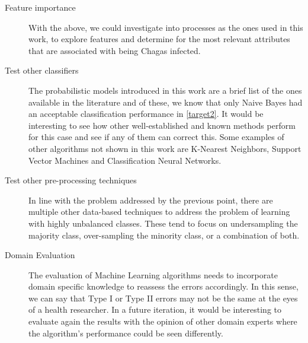 \begin{description}
    \item [Feature importance] With the above, we could investigate into processes as the ones used in this work, to explore features and determine for the most relevant attributes that are associated with being Chagas infected.

    \item [Test other classifiers] The probabilistic models introduced in this work are a brief list of the ones available in the literature and of these, we know that only Naive Bayes had an acceptable classification performance in \cref{target2}.
    It would be interesting to see how other well-established and known methods perform for this case and see if any of them can correct this.
    Some examples of other algorithms not shown in this work are K-Nearest Neighbors, Support Vector Machines and Classification Neural Networks.

    \item [Test other pre-processing techniques] In line with the problem addressed by the previous point, there are multiple other data-based techniques to address the problem of learning with highly unbalanced classes.
    These tend to focus on undersampling the majority class, over-sampling the minority class, or a combination of both.


    \item [Domain Evaluation] The evaluation of Machine Learning algorithms needs to incorporate domain specific knowledge to reassess the errors accordingly. In this sense, we can say that Type I or Type II errors may not be the same at the eyes of a health researcher.
    In a future iteration, it would be interesting to evaluate again the results with the opinion of other domain experts where the algorithm's performance could be seen differently.

\end{description}

